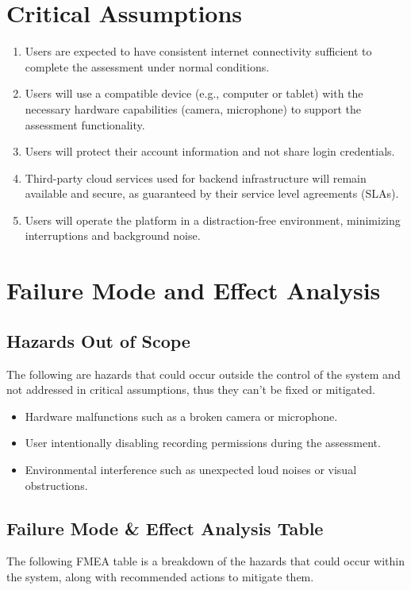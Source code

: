 \documentclass{article}
\begin{document}
\section{Critical Assumptions}
\begin{enumerate}
    \item Users are expected to have consistent internet connectivity sufficient to complete the assessment under normal conditions.
    \item Users will use a compatible device (e.g., computer or tablet) with the necessary hardware capabilities (camera, microphone) to support the assessment functionality.
    \item Users will protect their account information and not share login credentials.
    \item Third-party cloud services used for backend infrastructure will remain available and secure, as guaranteed by their service level agreements (SLAs).
    \item Users will operate the platform in a distraction-free environment, minimizing interruptions and background noise.
\end{enumerate}

\section{Failure Mode and Effect Analysis}
\subsection{Hazards Out of Scope}
The following are hazards that could occur outside the control of the system and not addressed in critical assumptions, thus they can't be fixed or mitigated.
\begin{itemize}
     \item Hardware malfunctions such as a broken camera or microphone.
     \item User intentionally disabling recording permissions during the assessment.
     \item Environmental interference such as unexpected loud noises or visual obstructions.
 \end{itemize}
\subsection{Failure Mode \& Effect Analysis Table}
The following FMEA table is a breakdown of the hazards that could occur within the system, along with recommended actions to mitigate them.
\end{document}
